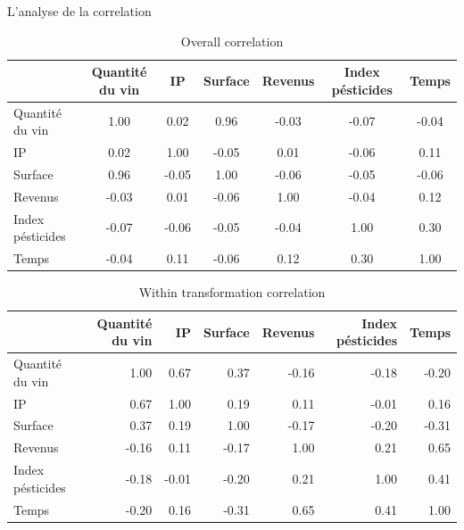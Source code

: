 \documentclass[11pt,ignorenonframetext,]{beamer}
\begin{document}
\begin{frame}{L'analyse de la correlation}
\protect\hypertarget{lanalyse-de-la-correlation}{}

\tiny

\normalsize

\tiny

\begin{table}[ht]
\centering
\begin{tabular}{l|cccccc}
  \hline
 & Quantité du vin & IP & Surface & Revenus & Index pésticides & Temps \\ 
  \hline
Quantité du vin & 1.00 & 0.02 & 0.96 & -0.03 & -0.07 & -0.04 \\ 
  IP & 0.02 & 1.00 & -0.05 & 0.01 & -0.06 & 0.11 \\ 
  Surface & 0.96 & -0.05 & 1.00 & -0.06 & -0.05 & -0.06 \\ 
  Revenus & -0.03 & 0.01 & -0.06 & 1.00 & -0.04 & 0.12 \\ 
  Index pésticides & -0.07 & -0.06 & -0.05 & -0.04 & 1.00 & 0.30 \\ 
  Temps & -0.04 & 0.11 & -0.06 & 0.12 & 0.30 & 1.00 \\ 
   \hline
\end{tabular}
\caption{Overall correlation} 
\end{table}

\normalsize

\tiny

\begin{table}[ht]
\centering
\begin{tabular}{l|rrrrrr}
  \hline
 & Quantité du vin & IP & Surface & Revenus & Index pésticides & Temps \\ 
  \hline
Quantité du vin & 1.00 & 0.67 & 0.37 & -0.16 & -0.18 & -0.20 \\ 
  IP & 0.67 & 1.00 & 0.19 & 0.11 & -0.01 & 0.16 \\ 
  Surface & 0.37 & 0.19 & 1.00 & -0.17 & -0.20 & -0.31 \\ 
  Revenus & -0.16 & 0.11 & -0.17 & 1.00 & 0.21 & 0.65 \\ 
  Index pésticides & -0.18 & -0.01 & -0.20 & 0.21 & 1.00 & 0.41 \\ 
  Temps & -0.20 & 0.16 & -0.31 & 0.65 & 0.41 & 1.00 \\ 
   \hline
\end{tabular}
\caption{Within transformation correlation} 
\end{table}

\normalsize

\end{frame}
\end{document}
